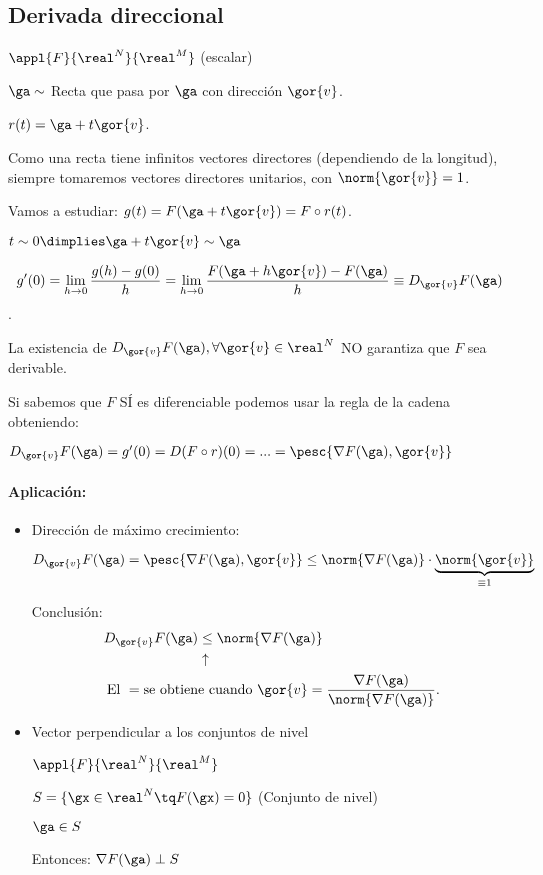 \subsection{Derivada direccional}

$\appl{F}{\real^N}{\real^M}$ (escalar)

$\ga \sim$ Recta que pasa por $\ga$ con dirección $\gor{v}$.

$r(t) = \ga + t\gor{v}$.

\obs
Como una recta tiene infinitos vectores directores (dependiendo de la longitud), siempre tomaremos vectores directores unitarios, con $\norm{\gor{v}} = 1$.


Vamos a estudiar: $g(t) = F(\ga + t\gor{v}) = F \circ r (t)$.

$t \sim 0 \dimplies \ga + t\gor{v} \sim \ga$
\begin{defn} 
$$g'(0) = \displaystyle\lim_{h \rightarrow 0} \frac{g(h)-g(0)}{h} = \displaystyle\lim_{h \rightarrow 0} \frac{F(\ga+h\gor{v})-F(\ga)}{h} \equiv D_{\gor{v}}F(\ga)$$.
\end{defn}

\obs
La existencia de $D_{\gor{v}}F(\ga), \forall \gor{v}\in \real^N$ NO garantiza que $F$ sea derivable.


Si sabemos que $F$ SÍ es diferenciable podemos usar la regla de la cadena obteniendo:

$D_{\gor{v}}F(\ga) = g'(0) = D(F\circ r)(0) = ... = \pesc{\nabla F(\ga),\gor{v}}$


\paragraph{Aplicación:}
\begin{itemize}
 \item
 Dirección de máximo crecimiento:

$D_{\gor{v}}F(\ga) = \pesc{\nabla F(\ga),\gor{v}}\leq \norm{\nabla F(\ga)}\cdot \underbrace{\norm{\gor{v}}}_{\equiv 1}$

Conclusión:
\begin{align*}
D_{\gor{v}}F(\ga) &\leq \norm{\nabla F(\ga)}\\
&\uparrow\\
\text{El }= \text{se obtien}&\text{e cuando }\gor{v} = \displaystyle \frac{\nabla F(\ga)}{\norm{\nabla F(\ga)}}.
\end{align*}


 \item
 Vector perpendicular a los conjuntos de nivel

 $\appl{F}{\real^N}{\real^M}$

 $S = \{ \gx \in \real^N \tq F(\gx) = 0\}$ (Conjunto de nivel)

 $\ga \in S$

 Entonces: $\nabla F(\ga) \perp S$
\end{itemize}

